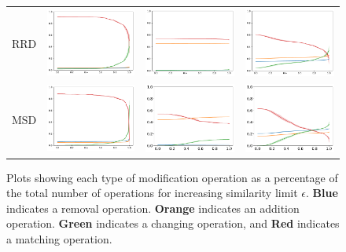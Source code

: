 \begin{figure}
\begin{tabular}{lccc}
    RRD      & \includegraphics[width=.25\linewidth]{code/img/operation_count_rrd_AT1.pdf} & \includegraphics[width=.25\linewidth]{code/img/operation_count_rrd_AT1-2.pdf} & \includegraphics[width=.25\linewidth]{code/img/operation_count_rrd_AT2.pdf} \\
    MSD      & \includegraphics[width=.25\linewidth]{code/img/operation_count_ms_AT1.pdf}  & \includegraphics[width=.25\linewidth]{code/img/operation_count_ms_AT1-2.pdf}  & \includegraphics[width=.25\linewidth]{code/img/operation_count_ms_AT2.pdf}
\end{tabular}
\caption{Plots showing each type of modification operation as a percentage of the total number of operations for increasing similarity limit $\epsilon$. {\color{color1} \textbf{Blue}} indicates a removal operation. {\color{color2} \textbf{Orange}} indicates an addition operation. {\color{color3} \textbf{Green}} indicates a changing operation, and {\color{color4} \textbf{Red}} indicates a matching operation. }
\label{fig:operations}
\end{figure}



